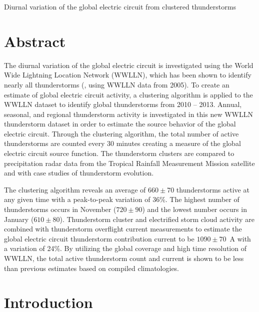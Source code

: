 
Diurnal variation of the global electric circuit from clustered thunderstorms

\section{Abstract}

The diurnal variation of the global electric circuit is investigated using the World Wide Lightning Location Network (WWLLN), which has been shown to identify nearly all thunderstorms (\citet{Jacobson2006c}, using WWLLN data from 2005).
To create an estimate of global electric circuit activity, a clustering algorithm is applied to the WWLLN dataset to identify global thunderstorms from 2010 -- 2013.
Annual, seasonal, and regional thunderstorm activity is investigated in this new WWLLN thunderstorm dataset in order to estimate the source behavior of the global electric circuit.
Through the clustering algorithm, the total number of active thunderstorms are counted every 30 minutes creating a measure of the global electric circuit source function.
The thunderstorm clusters are compared to precipitation radar data from the Tropical Rainfall Measurement Mission satellite and with case studies of thunderstorm evolution.

The clustering algorithm reveals an average of $660 \pm 70$ thunderstorms active at any given time with a peak-to-peak variation of 36\%.
The highest number of thunderstorms occurs in November ($720 \pm 90$) and the lowest number occurs in January ($610 \pm 80$).
Thunderstorm cluster and electrified storm cloud activity are combined with thunderstorm overflight current measurements to estimate the global electric circuit thunderstorm contribution current to be $1090 \pm 70$~A with a variation of 24\%.
By utilizing the global coverage and high time resolution of WWLLN, the total active thunderstorm count and current is shown to be less than previous estimates based on compiled climatologies.

\section{Introduction}

